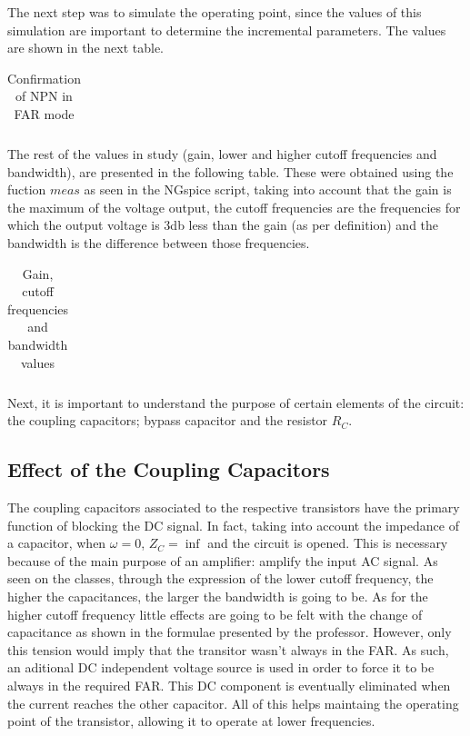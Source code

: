 \par The next step was to simulate the operating point, since the values of this simulation are important to determine the incremental parameters. The values are shown in the next table.

\begin{table}[ht]
  \centering
  \begin{tabular}{|l|r|}
    \hline    
   
     \end{tabular}
  \caption{Confirmation of NPN in FAR mode}
  \label{tab:op}
    
\end{table}

\par The rest of the values in study (gain, lower and higher cutoff frequencies and bandwidth),  are presented in the following table. These were obtained using the fuction $meas$ as seen in the NGspice script, taking into account that the gain is the maximum of the voltage output, the cutoff frequencies are the frequencies for which the output voltage is 3db less than the gain (as per definition) and the bandwidth is the difference between those frequencies.

\begin{table}[ht]
  \centering
  \begin{tabular}{|l|r|}
    \hline    
   
    \end{tabular}
  \caption{Gain, cutoff frequencies and bandwidth values}
    \label{tab:results}
\end{table}

\par Next, it is important to understand the purpose of certain elements of the circuit: the coupling capacitors; bypass capacitor and the resistor $R_C$. 

\subsection{Effect of the Coupling Capacitors}

\par The coupling capacitors associated to the respective transistors have the primary function of blocking the DC signal. In fact, taking into account the impedance of a capacitor, when $\omega=0$, $Z_C=\inf$ and the circuit is opened. This is necessary because of the main purpose of an amplifier: amplify the input AC signal. As seen on the classes, through the expression of the lower cutoff frequency, the higher the capacitances, the larger the bandwidth is going to be. As for the higher cutoff frequency little effects are going to be felt with the change of capacitance as shown in the formulae presented by the professor. However, only this tension would imply that the transitor wasn't always in the FAR. As such, an aditional DC independent voltage source is used in order to force it to be always in the required FAR. This DC component is eventually eliminated when the current reaches the other capacitor. All of this helps maintaing the operating point of the transistor, allowing it to operate at lower frequencies.

